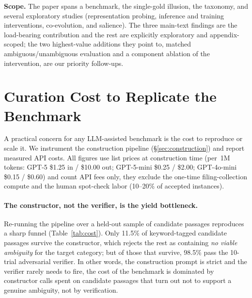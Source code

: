 \textbf{Scope.} The paper spans a benchmark, the single-gold illusion, the taxonomy, and several
exploratory studies (representation probing, inference and training interventions, co-evolution,
and salience). The three main-text findings are the load-bearing contribution and the rest are
explicitly exploratory and appendix-scoped; the two highest-value additions they point to,
matched ambiguous/unambiguous evaluation and a component ablation of the intervention, are our
priority follow-ups.

\section{Curation Cost to Replicate the Benchmark}
\label{app:cost}

A practical concern for any LLM-assisted benchmark is the cost to reproduce or
scale it. We instrument the construction pipeline (\S\ref{sec:construction}) and
report measured API costs. All figures use list prices at construction time
(per~1M tokens: GPT-5 \$1.25 in / \$10.00 out; GPT-5-mini \$0.25 / \$2.00;
GPT-4o-mini \$0.15 / \$0.60) and count API fees only, they exclude the one-time
filing-collection compute and the human spot-check labor (10--20\% of
accepted instances).

\paragraph{The constructor, not the verifier, is the yield bottleneck.}
Re-running the pipeline over a held-out sample of candidate passages reproduces
a sharp funnel (Table~\ref{tab:cost}). Only 11.5\% of keyword-tagged candidate
passages survive the constructor, which rejects the rest as containing
\emph{no viable ambiguity} for the target category; but of those that survive,
98.5\% pass the 10-trial adversarial verifier. In other words, the
construction prompt is strict and the verifier rarely needs to fire, the cost
of the benchmark is dominated by constructor calls spent on candidate passages
that turn out not to support a genuine ambiguity, not by verification.

